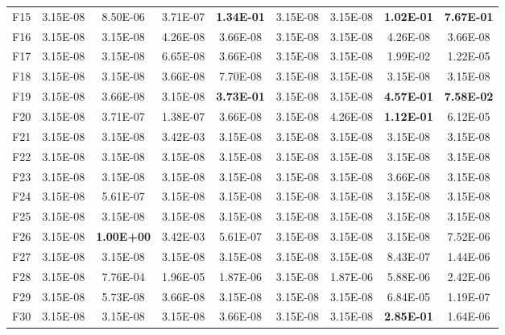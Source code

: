 \documentclass[preprint,review,compress,12pt]{elsarticle}
\begin{document}
\begin{table}[H]
{\begin{tabular}{ccccccccc}
F15 & 3.15E-08 & 8.50E-06          & 3.71E-07 & \textbf{1.34E-01} & 3.15E-08 & 3.15E-08 & \textbf{1.02E-01} & \textbf{7.67E-01} \\
F16 & 3.15E-08 & 3.15E-08          & 4.26E-08 & 3.66E-08          & 3.15E-08 & 3.15E-08 & 4.26E-08          & 3.66E-08          \\
F17 & 3.15E-08 & 3.15E-08          & 6.65E-08 & 3.66E-08          & 3.15E-08 & 3.15E-08 & 1.99E-02          & 1.22E-05          \\
F18 & 3.15E-08 & 3.15E-08          & 3.66E-08 & 7.70E-08          & 3.15E-08 & 3.15E-08 & 3.15E-08          & 3.15E-08          \\
F19 & 3.15E-08 & 3.66E-08          & 3.15E-08 & \textbf{3.73E-01} & 3.15E-08 & 3.15E-08 & \textbf{4.57E-01} & \textbf{7.58E-02} \\
F20 & 3.15E-08 & 3.71E-07          & 1.38E-07 & 3.66E-08          & 3.15E-08 & 4.26E-08 & \textbf{1.12E-01} & 6.12E-05          \\
F21 & 3.15E-08 & 3.15E-08          & 3.42E-03 & 3.15E-08          & 3.15E-08 & 3.15E-08 & 3.15E-08          & 3.15E-08          \\
F22 & 3.15E-08 & 3.15E-08          & 3.15E-08 & 3.15E-08          & 3.15E-08 & 3.15E-08 & 3.15E-08          & 3.15E-08          \\
F23 & 3.15E-08 & 3.15E-08          & 3.15E-08 & 3.15E-08          & 3.15E-08 & 3.15E-08 & 3.66E-08          & 3.15E-08          \\
F24 & 3.15E-08 & 5.61E-07          & 3.15E-08 & 3.15E-08          & 3.15E-08 & 3.15E-08 & 3.15E-08          & 3.15E-08          \\
F25 & 3.15E-08 & 3.15E-08          & 3.15E-08 & 3.15E-08          & 3.15E-08 & 3.15E-08 & 3.15E-08          & 3.15E-08          \\
F26 & 3.15E-08 & \textbf{1.00E+00} & 3.42E-03 & 5.61E-07          & 3.15E-08 & 3.15E-08 & 3.15E-08          & 7.52E-06          \\
F27 & 3.15E-08 & 3.15E-08          & 3.15E-08 & 3.15E-08          & 3.15E-08 & 3.15E-08 & 8.43E-07          & 1.44E-06          \\
F28 & 3.15E-08 & 7.76E-04          & 1.96E-05 & 1.87E-06          & 3.15E-08 & 1.87E-06 & 5.88E-06          & 2.42E-06          \\
F29 & 3.15E-08 & 5.73E-08          & 3.66E-08 & 3.15E-08          & 3.15E-08 & 3.15E-08 & 6.84E-05          & 1.19E-07          \\
F30 & 3.15E-08 & 3.15E-08          & 3.15E-08 & 3.66E-08          & 3.15E-08 & 3.15E-08 & \textbf{2.85E-01} & 1.64E-06   \\
\bottomrule
\end{tabular}
}
\end{table}
\end{document}
